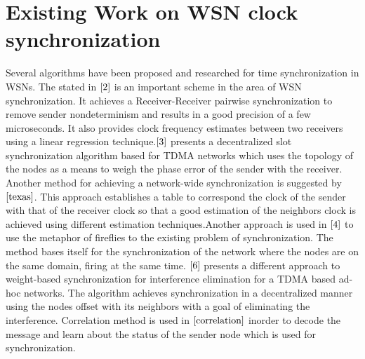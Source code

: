 \documentclass[a4paper,10pt]{report}
\begin{document}
\section{\textbf{Existing Work on WSN clock synchronization}}
Several algorithms have been proposed and researched for time synchronization in WSNs. The  stated in $\cite{2}$ is an important scheme in the area of WSN synchronization. It achieves a Receiver-Receiver pairwise synchronization to remove sender nondeterminism and results in a good precision of a few microseconds. It also provides clock
frequency estimates between two receivers using a linear regression technique.$\cite{3}$ presents a decentralized slot synchronization algorithm based for TDMA networks which uses the topology of the nodes as a means to weigh the phase error of the sender with the receiver. \newline 
Another method for achieving a network-wide synchronization is suggested by $\cite{texas}$. This approach establishes a table to
correspond the clock of the sender with that of the receiver clock so that a good estimation of the neighbors clock is achieved using different estimation techniques.Another approach is used in $\cite{4}$ to use the metaphor of fireflies to the existing problem of synchronization. The method bases itself for the synchronization of the network where the nodes are on the same domain, firing at the same time. $\cite{6}$ presents a different approach to weight-based synchronization for interference elimination for a TDMA based ad-hoc networks. The algorithm achieves synchronization in a decentralized manner using the nodes offset with its neighbors with a goal of eliminating the interference. Correlation method is used in $\cite{correlation}$ inorder to decode the message and learn about the status of the sender node which is used for synchronization.
\end{document}
